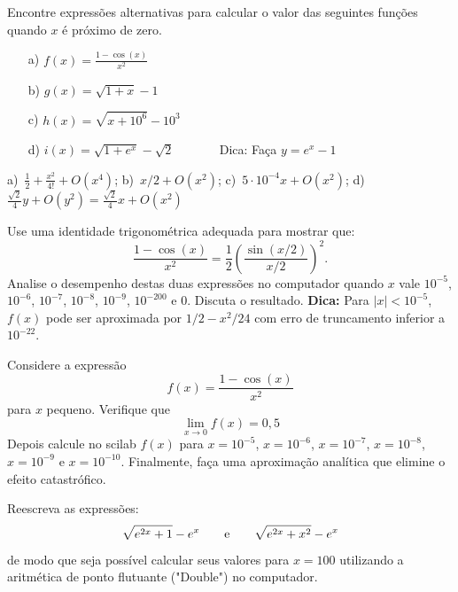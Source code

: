 \documentclass[main.tex]{subfiles}
\begin{document}
\begin{Exercise} Encontre expressões alternativas para calcular o valor das seguintes funções quando $x$ é próximo de zero.
\begin{itemize}
\item[a)] $f(x)=\frac{1-\cos(x)}{x^2}$
\item[b)] $g(x)=\sqrt{1+x}-1$
\item[c)] $h(x)=\sqrt{x+10^6}-10^3$
\item[d)] $i(x)=\sqrt{1+e^{x}}-\sqrt{2}$ ~~~~~~ Dica: Faça $y=e^{x}-1$
\end{itemize}
\end{Exercise}
\begin{Answer}
  \begin{tiny}
    a)~$\frac{1}{2}+\frac{x^2}{4!}+O(x^4)$; b)~$x/2+O(x^2)$; c)~$5\cdot 10^{-4}x+O(x^2)$; d)~$\frac{\sqrt{2}}{4}y+O(y^{2})=\frac{\sqrt{2}}{4}x+O(x^2)$
  \end{tiny}
\end{Answer}

\begin{Exercise} Use uma identidade trigonométrica adequada para mostrar que:
  \begin{equation*}
    \frac{1-\cos(x)}{x^2}= \frac{1}{2} \left(\frac{\sin(x/2)}{x/2}\right)^2.
  \end{equation*}
Analise o desempenho destas duas expressões no computador quando $x$ vale $10^{-5}$, $10^{-6}$, $10^{-7}$, $10^{-8}$, $10^{-9}$, $10^{-200}$ e $0$. Discuta o resultado.
{\bf Dica:} Para $|x|<10^{-5}$, $f(x)$ pode ser aproximada por $1/2-x^2/24$ com erro de truncamento inferior a $10^{-22}$.
\end{Exercise}

\begin{Exercise} Considere a expressão
$$
f(x)=\frac{1-\cos(x)}{x^2}
$$
para $x$ pequeno. Verifique que
$$
\lim_{x\to 0}f(x)=0,5
$$
Depois calcule no scilab $f(x)$ para $x=10^{-5}$, $x=10^{-6}$, $x=10^{-7}$, $x=10^{-8}$, $x=10^{-9}$ e $x=10^{-10}$. Finalmente, faça uma aproximação analítica que elimine o efeito catastrófico.
\end{Exercise}

\begin{Exercise}[title=Notas do prof. Guidi] Reescreva as expressões:
  $$\sqrt{e^{2x}+1}-e^x \qquad\hbox{e}\qquad \sqrt{e^{2x}+x^2}-e^x $$
  de modo que seja possível calcular seus valores para $x=100$ utilizando a aritmética de ponto flutuante ("Double") no computador.
\end{Exercise}
\end{document}
